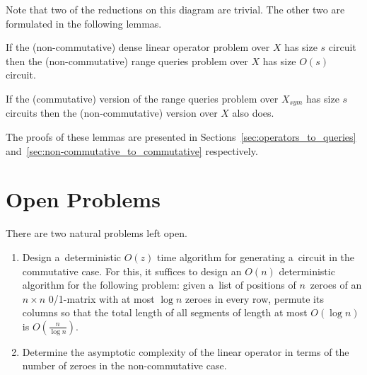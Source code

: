 \documentclass[a4paper,UKenglish,cleveref, autoref]{lipics-v2019}
\begin{document}
Note that two of the reductions on this diagram are trivial. The other two are formulated in the following lemmas.


%
%

\begin{lemma} \label{lem:dense_matrices}
If the (non-commutative) dense linear operator problem over $X$ has size $s$ circuit then the (non-commutative) range queries problem over $X$ has size $O(s)$ circuit.
\end{lemma}

\begin{lemma} \label{lem:intervals}
If the (commutative) version of the range queries problem over $X_{sym}$ has size $s$ circuits then the (non-commutative) version over $X$ also does.
\end{lemma}

The proofs of these lemmas are presented in Sections~\ref{sec:operators_to_queries} and~\ref{sec:non-commutative_to_commutative} respectively.





\section{Open Problems}
There are two natural problems left open.
\begin{enumerate}
\item Design a~deterministic $O(z)$ time algorithm for generating
a~circuit in the commutative case.
For this, it suffices to design an $O(n)$ deterministic algorithm for the following problem: given a~list of positions
of $n$~zeroes of an $n \times n$ 0/1-matrix with at most $\log n$ zeroes in every row, permute its columns so that the total length of all segments of length at most $O(\log n)$ is $O(\frac{n}{\log n})$.
\item Determine the asymptotic complexity of the linear operator in terms of the number of zeroes in the non-commutative case.
\end{enumerate}
\end{document}
